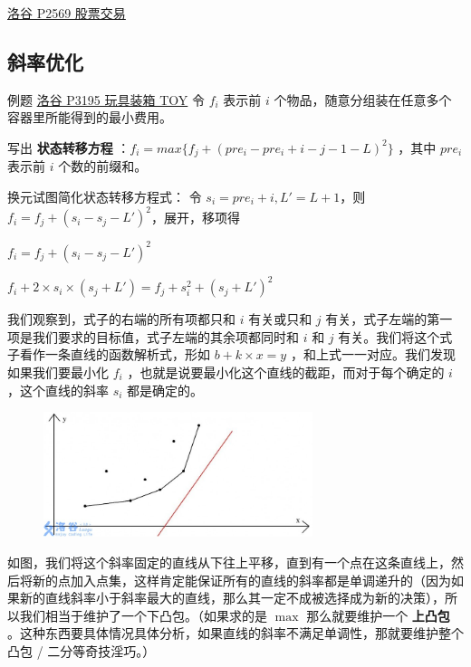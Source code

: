 \href{https://www.luogu.org/problemnew/show/P2569}{洛谷 P2569 股票交易}

\subsection{斜率优化}

\begin{NOTE}{例题 \href{https://www.luogu.org/problemnew/show/P3195}{洛谷 P3195 玩具装箱 TOY}}{}
令 $f_i$ 表示前 $i$ 个物品，随意分组装在任意多个容器里所能得到的最小费用。

\end{NOTE}


写出 \textbf{ 状态转移方程 } ：$f_i=max\{f_j+(pre_i-pre_i+i-j-1-L)^2\}$ ，其中 $pre_i$ 表示前 $i$ 个数的前缀和。

换元试图简化状态转移方程式： 令 $s_i=pre_i+i,L'=L+1$，则 $f_i=f_j+(s_i-s_j-L')^2$，展开，移项得

$f_i=f_j+(s_i-s_j-L')^2$

$f_i+2\times s_i\times (s_j+L')=f_j+s_i^2+(s_j+L')^2$

我们观察到，式子的右端的所有项都只和 $i$ 有关或只和 $j$ 有关，式子左端的第一项是我们要求的目标值，式子左端的其余项都同时和 $i$ 和 $j$ 有关。我们将这个式子看作一条直线的函数解析式，形如 $b+k\times x=y$ ，和上式一一对应。我们发现如果我们要最小化 $f_i$ ，也就是说要最小化这个直线的截距，而对于每个确定的 $i$，这个直线的斜率 $s_i$ 都是确定的。

\begin{figure}[htbp]
\centering
\includegraphics[width=0.7\textwidth]{docs/dp/images/optimization.png} 

\end{figure}

如图，我们将这个斜率固定的直线从下往上平移，直到有一个点在这条直线上，然后将新的点加入点集，这样肯定能保证所有的直线的斜率都是单调递升的（因为如果新的直线斜率小于斜率最大的直线，那么其一定不成被选择成为新的决策），所以我们相当于维护了一个下凸包。（如果求的是 $\max$ 那么就要维护一个 \textbf{ 上凸包 } 。这种东西要具体情况具体分析，如果直线的斜率不满足单调性，那就要维护整个凸包 / 二分等奇技淫巧。）

